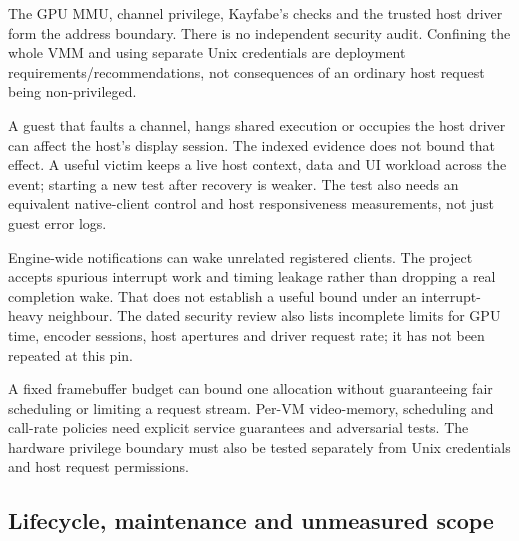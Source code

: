\doc The GPU MMU, channel privilege, Kayfabe's checks and the trusted host driver form the
address boundary. There is no independent security audit. Confining the whole VMM and using
separate Unix credentials are deployment requirements/recommendations, not consequences of
an ordinary host request being non-privileged.

\unmeasured A guest that faults a channel, hangs shared execution or occupies the host driver
can affect the host's display session. The indexed evidence does not bound that effect.
A useful victim keeps a live host context, data and UI workload across the event; starting a
new test after recovery is weaker. The test also needs an equivalent native-client control
and host responsiveness measurements, not just guest error logs.

\doc Engine-wide notifications can wake unrelated registered clients. The project accepts
spurious interrupt work and timing leakage rather than dropping a real completion wake.
That does not establish a useful bound under an interrupt-heavy neighbour. The dated security
review also lists incomplete limits for GPU time, encoder sessions, host apertures and driver
request rate; it has not been repeated at this pin.

\inferred A fixed framebuffer budget can bound one allocation without guaranteeing fair
scheduling or limiting a request stream. Per-VM video-memory, scheduling and call-rate policies
need explicit service guarantees and adversarial tests. The hardware privilege boundary must
also be tested separately from Unix credentials and host request permissions.

\subsection{Lifecycle, maintenance and unmeasured scope}

